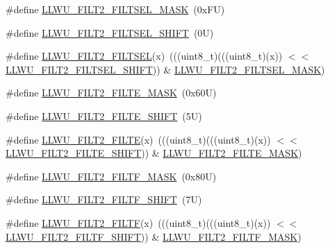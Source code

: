\begin{DoxyCompactItemize}
\item 
\#define \mbox{\hyperlink{group___l_l_w_u___register___masks_gae610069172bf4a4b8f783d54faf97496}{L\+L\+W\+U\+\_\+\+F\+I\+L\+T2\+\_\+\+F\+I\+L\+T\+S\+E\+L\+\_\+\+M\+A\+SK}}~(0x\+F\+U)
\item 
\#define \mbox{\hyperlink{group___l_l_w_u___register___masks_ga4589e4982f58847b133e9792fac931ac}{L\+L\+W\+U\+\_\+\+F\+I\+L\+T2\+\_\+\+F\+I\+L\+T\+S\+E\+L\+\_\+\+S\+H\+I\+FT}}~(0\+U)
\item 
\#define \mbox{\hyperlink{group___l_l_w_u___register___masks_ga158cb43770e2439838189522bb7696a3}{L\+L\+W\+U\+\_\+\+F\+I\+L\+T2\+\_\+\+F\+I\+L\+T\+S\+EL}}(x)~(((uint8\+\_\+t)(((uint8\+\_\+t)(x)) $<$$<$ \mbox{\hyperlink{group___l_l_w_u___register___masks_ga4589e4982f58847b133e9792fac931ac}{L\+L\+W\+U\+\_\+\+F\+I\+L\+T2\+\_\+\+F\+I\+L\+T\+S\+E\+L\+\_\+\+S\+H\+I\+FT}})) \& \mbox{\hyperlink{group___l_l_w_u___register___masks_gae610069172bf4a4b8f783d54faf97496}{L\+L\+W\+U\+\_\+\+F\+I\+L\+T2\+\_\+\+F\+I\+L\+T\+S\+E\+L\+\_\+\+M\+A\+SK}})
\item 
\#define \mbox{\hyperlink{group___l_l_w_u___register___masks_ga6c6d4145e30bdb324bc6b137b2f7aada}{L\+L\+W\+U\+\_\+\+F\+I\+L\+T2\+\_\+\+F\+I\+L\+T\+E\+\_\+\+M\+A\+SK}}~(0x60\+U)
\item 
\#define \mbox{\hyperlink{group___l_l_w_u___register___masks_gac309ec1ef795572d048b09ac35847bf1}{L\+L\+W\+U\+\_\+\+F\+I\+L\+T2\+\_\+\+F\+I\+L\+T\+E\+\_\+\+S\+H\+I\+FT}}~(5\+U)
\item 
\#define \mbox{\hyperlink{group___l_l_w_u___register___masks_ga3c7ed2286e6f1a0041610a9b7de636ef}{L\+L\+W\+U\+\_\+\+F\+I\+L\+T2\+\_\+\+F\+I\+L\+TE}}(x)~(((uint8\+\_\+t)(((uint8\+\_\+t)(x)) $<$$<$ \mbox{\hyperlink{group___l_l_w_u___register___masks_gac309ec1ef795572d048b09ac35847bf1}{L\+L\+W\+U\+\_\+\+F\+I\+L\+T2\+\_\+\+F\+I\+L\+T\+E\+\_\+\+S\+H\+I\+FT}})) \& \mbox{\hyperlink{group___l_l_w_u___register___masks_ga6c6d4145e30bdb324bc6b137b2f7aada}{L\+L\+W\+U\+\_\+\+F\+I\+L\+T2\+\_\+\+F\+I\+L\+T\+E\+\_\+\+M\+A\+SK}})
\item 
\#define \mbox{\hyperlink{group___l_l_w_u___register___masks_gab60be1393d84433fe44d4b332a77537c}{L\+L\+W\+U\+\_\+\+F\+I\+L\+T2\+\_\+\+F\+I\+L\+T\+F\+\_\+\+M\+A\+SK}}~(0x80\+U)
\item 
\#define \mbox{\hyperlink{group___l_l_w_u___register___masks_ga20b3ccaef11cade3a0dc88b3a378b790}{L\+L\+W\+U\+\_\+\+F\+I\+L\+T2\+\_\+\+F\+I\+L\+T\+F\+\_\+\+S\+H\+I\+FT}}~(7\+U)
\item 
\#define \mbox{\hyperlink{group___l_l_w_u___register___masks_gaa36637f2a12654139ec6c8b76f313c8d}{L\+L\+W\+U\+\_\+\+F\+I\+L\+T2\+\_\+\+F\+I\+L\+TF}}(x)~(((uint8\+\_\+t)(((uint8\+\_\+t)(x)) $<$$<$ \mbox{\hyperlink{group___l_l_w_u___register___masks_ga20b3ccaef11cade3a0dc88b3a378b790}{L\+L\+W\+U\+\_\+\+F\+I\+L\+T2\+\_\+\+F\+I\+L\+T\+F\+\_\+\+S\+H\+I\+FT}})) \& \mbox{\hyperlink{group___l_l_w_u___register___masks_gab60be1393d84433fe44d4b332a77537c}{L\+L\+W\+U\+\_\+\+F\+I\+L\+T2\+\_\+\+F\+I\+L\+T\+F\+\_\+\+M\+A\+SK}})
\end{DoxyCompactItemize}
